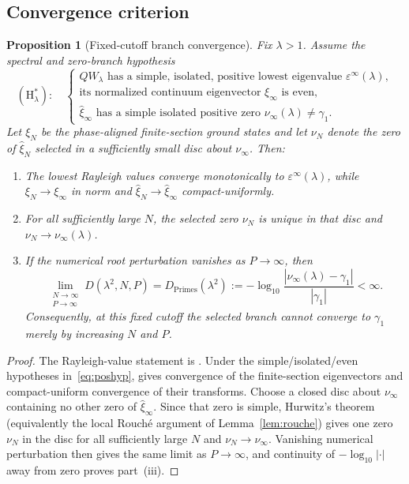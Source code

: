 \documentclass[11pt,a4paper]{article}
\newtheorem{proposition}{Proposition}
\begin{document}
\subsection{Convergence criterion}\label{ssec:criterion}

\begin{proposition}[Fixed-cutoff branch convergence]\label{prop:limit}
Fix $\lambda>1$. Assume the spectral and zero-branch hypothesis
\begin{equation}\label{eq:poshyp}
  (\mathrm{H}_\lambda^\ast):\quad
  \begin{cases}
  QW_\lambda \text{ has a simple, isolated, positive lowest eigenvalue }
       \varepsilon^\infty(\lambda),\\
  \text{its normalized continuum eigenvector }\xi_\infty
       \text{ is even},\\
  \widehat\xi_\infty \text{ has a simple isolated positive zero }
       \nu_\infty(\lambda)\ne\gamma_1 .
  \end{cases}
\end{equation}
Let $\xi_N$ be the phase-aligned finite-section ground states and let $\nu_N$
denote the zero of $\widehat\xi_N$ selected in a sufficiently small disc about
$\nu_\infty$. Then:
\begin{enumerate}
\item[(i)] The lowest Rayleigh values converge monotonically to
  $\varepsilon^\infty(\lambda)$, while
  $\xi_N\to\xi_\infty$ in norm and
  $\widehat\xi_N\to\widehat\xi_\infty$ compact-uniformly.
\item[(ii)] For all sufficiently large $N$, the selected zero $\nu_N$ is unique
  in that disc and $\nu_N\to\nu_\infty(\lambda)$.
\item[(iii)] If the numerical root perturbation vanishes as $P\to\infty$, then
  \[
    \lim_{\substack{N\to\infty\\P\to\infty}}
    D(\lambda^2,N,P)
    =D_{\mathrm{Primes}}(\lambda^2)
    :=-\log_{10}\frac{|\nu_\infty(\lambda)-\gamma_1|}{|\gamma_1|}
    <\infty .
  \]
  Consequently, at this fixed cutoff the selected branch cannot converge to
  $\gamma_1$ merely by increasing $N$ and $P$.
\end{enumerate}
\end{proposition}
\begin{proof}
The Rayleigh-value statement is \cite[Prop.~3.4]{CCM2025}. Under the
simple/isolated/even hypotheses in~\eqref{eq:poshyp},
\cite[Thm.~6.1]{CvS2025} gives convergence of the finite-section eigenvectors
and compact-uniform convergence of their transforms. Choose a closed disc about
$\nu_\infty$ containing no other zero of $\widehat\xi_\infty$. Since that zero
is simple, Hurwitz's theorem (equivalently the local Rouch\'e argument of
Lemma~\ref{lem:rouche}) gives one zero $\nu_N$ in the disc for all sufficiently
large $N$ and $\nu_N\to\nu_\infty$. Vanishing numerical perturbation then gives
the same limit as $P\to\infty$, and continuity of $-\log_{10}|\cdot|$ away from
zero proves part~(iii).
\end{proof}
\end{document}
